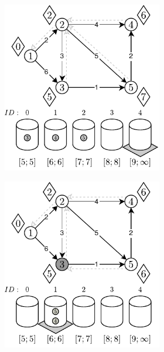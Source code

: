 \begin{figure}[!htbp]
\begin{subfigure}[b]{\textwidth}
\begin{subfigure}[b]{0.32\textwidth}
			\includegraphics[width=\textwidth]{Chapter_II/OVERFLOW-BUCKET-Example/d.pdf}
			\caption{}
			\label{fig:exampleOverflowBucket:d}
		\end{subfigure}
		\hfill
		\begin{subfigure}[b]{0.32\textwidth}
			\includegraphics[width=\textwidth]{Chapter_II/OVERFLOW-BUCKET-Example/e.pdf}

\end{subfigure}
\end{subfigure}
\end{figure}
